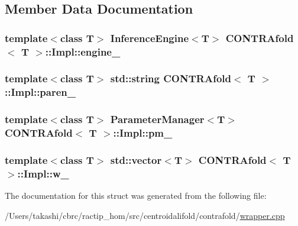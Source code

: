 \subsection{Member Data Documentation}
\hypertarget{struct_c_o_n_t_r_afold_1_1_impl_adde72cf14dda475c1088b37e5fa091b2}{
\subsubsection[{engine\+\_\+}]{\setlength{\rightskip}{0pt plus 5cm}template$<$class T$>$ {\bf Inference\+Engine}$<$T$>$ {\bf C\+O\+N\+T\+R\+Afold}$<$ T $>$\+::Impl\+::engine\+\_\+}}\label{struct_c_o_n_t_r_afold_1_1_impl_adde72cf14dda475c1088b37e5fa091b2}
\hypertarget{struct_c_o_n_t_r_afold_1_1_impl_a1fecee16c367e647f3760913c5306623}{
\subsubsection[{paren\+\_\+}]{\setlength{\rightskip}{0pt plus 5cm}template$<$class T$>$ std\+::string {\bf C\+O\+N\+T\+R\+Afold}$<$ T $>$\+::Impl\+::paren\+\_\+}}\label{struct_c_o_n_t_r_afold_1_1_impl_a1fecee16c367e647f3760913c5306623}
\hypertarget{struct_c_o_n_t_r_afold_1_1_impl_ad2b5c0b67a930f6968a0f4200df70a7f}{
\subsubsection[{pm\+\_\+}]{\setlength{\rightskip}{0pt plus 5cm}template$<$class T$>$ {\bf Parameter\+Manager}$<$T$>$ {\bf C\+O\+N\+T\+R\+Afold}$<$ T $>$\+::Impl\+::pm\+\_\+}}\label{struct_c_o_n_t_r_afold_1_1_impl_ad2b5c0b67a930f6968a0f4200df70a7f}
\hypertarget{struct_c_o_n_t_r_afold_1_1_impl_a951858d815f6deeb4e4be5da4d0e328c}{
\subsubsection[{w\+\_\+}]{\setlength{\rightskip}{0pt plus 5cm}template$<$class T$>$ std\+::vector$<$T$>$ {\bf C\+O\+N\+T\+R\+Afold}$<$ T $>$\+::Impl\+::w\+\_\+}}\label{struct_c_o_n_t_r_afold_1_1_impl_a951858d815f6deeb4e4be5da4d0e328c}


The documentation for this struct was generated from the following file\+:\begin{DoxyCompactItemize}
\item 
/\+Users/takashi/cbrc/ractip\+\_\+hom/src/centroidalifold/contrafold/\hyperlink{contrafold_2wrapper_8cpp}{wrapper.\+cpp}\end{DoxyCompactItemize}
